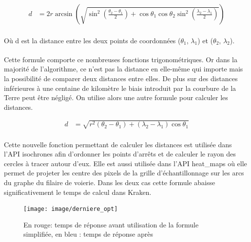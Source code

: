 \documentclass[a4paper]{report}
\begin{document}
\begin{align}
	d &= 2r\arcsin\left(\sqrt{\sin^2\left(\frac{\theta_{2} - \theta_{1}}{2}\right)+\cos\theta_{1}\cos\theta_{2}\sin^2\left(\frac{\lambda_{2} - \lambda_{1}}{2}\right)}\right)
\end{align}

\paragraph{} Où d est la distance entre les deux points de coordonnées ($\theta_{1}$, $\lambda_{1}$) et ($\theta_{2}$, $\lambda_{2}$).

\paragraph{} Cette formule comporte ce nombreuses fonctions trigonométriques. Or dans la majorité de l'algorithme, ce n'est pas la distance en elle-même qui importe mais la possibilité de comparer deux distances entre elles. De plus sur des distances inférieures à une centaine de kilomètre le biais introduit par la courbure de la Terre peut être négligé. On utilise alors une autre formule pour calculer les distances.

\begin{align}
	d &= \sqrt{r^2\left(\theta_{2} - \theta_{1}\right)+\left(\lambda_{2} - \lambda_{1}\right)\cos\theta_{1}}
\end{align}

\paragraph{} Cette nouvelle fonction permettant de calculer les distances est utilisée dans l'API isochrones afin d'ordonner les points d'arrêts et de calculer le rayon des cercles à tracer autour d'eux. Elle est aussi utilisée dans l'API heat\_maps où elle permet de projeter les centre des pixels de la grille d'échantillonnage sur les arcs du graphe du filaire de voierie. Dans les deux cas cette formule abaisse significativement le temps de calcul dans Kraken. 

\begin{figure}[H]
	\begin{center}
		\texttt{[image: image/derniere\_opt]}
		\caption{En rouge: temps de réponse avant utilisation de la formule simplifiée, en bleu : temps de réponse après}
		\label{Temps de réponse après utilisation de la formule simplifiée}
	\end{center}
\end{figure}
\end{document}
